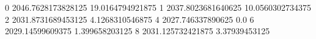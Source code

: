 0 2046.7628173828125 19.0164794921875
1 2037.8023681640625 10.0560302734375
2 2031.8731689453125 4.1268310546875
4 2027.746337890625 0.0
6 2029.14599609375 1.399658203125
8 2031.125732421875 3.37939453125
